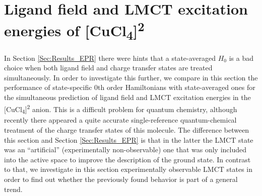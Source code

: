 \section{Ligand field and LMCT excitation energies of [CuCl\textsubscript{4}]\textsuperscript{2\textminus}}
\label{Sec:LFvsLMCT}
In Section \ref{Sec:Results_EPR} there were hints that a state-averaged ${H_0}$ is a bad choice when both ligand field and charge transfer states are treated simultaneously. In order to investigate this further, we compare in this section the performance of state-specific 0th order Hamiltonians with state-averaged ones for the simultaneous prediction of ligand field and LMCT excitation energies in the [CuCl\textsubscript{4}]\textsuperscript{2\textminus} anion. This is a difficult problem for quantum chemistry, although recently there appeared a quite accurate single-reference quantum-chemical treatment of the charge transfer states of this molecule.\cite{EharaPLG_2012_94} The difference between this section and Section \ref{Sec:Results_EPR} is that in the latter the LMCT state was an “artificial” (experimentally non-observable) one that was only included into the active space to improve the description of the ground state. In contrast to that, we investigate in this section experimentally observable LMCT states in order to find out whether the previously found behavior is part of a general trend.


